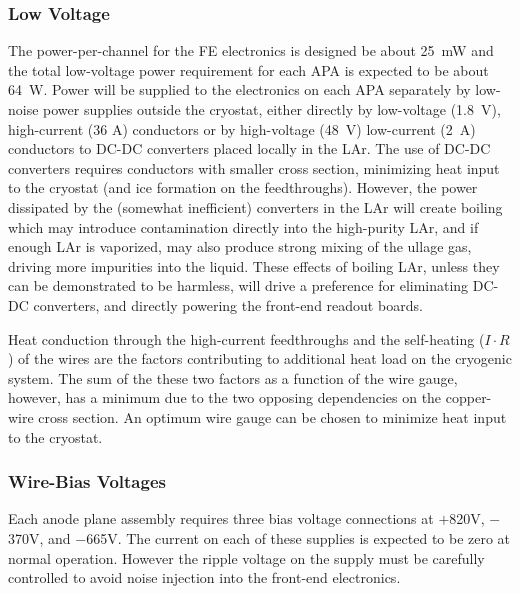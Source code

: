 \subsubsection{Low Voltage}
\label{subsubsec:ce_feedthrough_wirebias}


The power-per-channel for the FE electronics is designed be about 25~mW and the total low-voltage
power requirement for each APA is expected to be about 64~W.
Power will be supplied to the electronics on each APA separately by low-noise
power supplies outside the cryostat, either directly by
low-voltage (1.8~V), high-current (36 A) conductors or by high-voltage (48~V)
low-current (2~A) conductors to DC-DC converters placed locally in the LAr.
The use of DC-DC converters requires conductors with smaller cross section,
minimizing heat input to the cryostat (and ice formation on the feedthroughs).
However, the power dissipated by the (somewhat inefficient) converters in
the LAr will create boiling which may introduce contamination directly into the 
high-purity LAr, and if enough LAr is vaporized, may also produce strong mixing of the
ullage gas, driving more impurities into the liquid.
These effects of boiling LAr, unless they can be demonstrated to be harmless,
will drive a preference for eliminating DC-DC converters, and directly powering the front-end readout boards.

Heat conduction through the high-current feedthroughs and the self-heating ($I\cdot R$) of the wires are the factors
contributing to additional heat load on the cryogenic system.
The sum of the these two factors as a function of the wire gauge, however, has a minimum 
due to the two opposing dependencies on the copper-wire cross section.
An optimum wire gauge can be chosen to minimize heat input to the cryostat.

%
\subsubsection{Wire-Bias Voltages}
\label{subsubsec:ce_feedthrough_wirebias}

Each anode plane assembly requires three bias voltage connections 
at $+$820V, $-$370V, and $-$665V.
The current on each of these supplies is expected to be zero at normal operation.
However the ripple voltage on the supply must be carefully controlled 
to avoid noise injection into the front-end electronics.  

